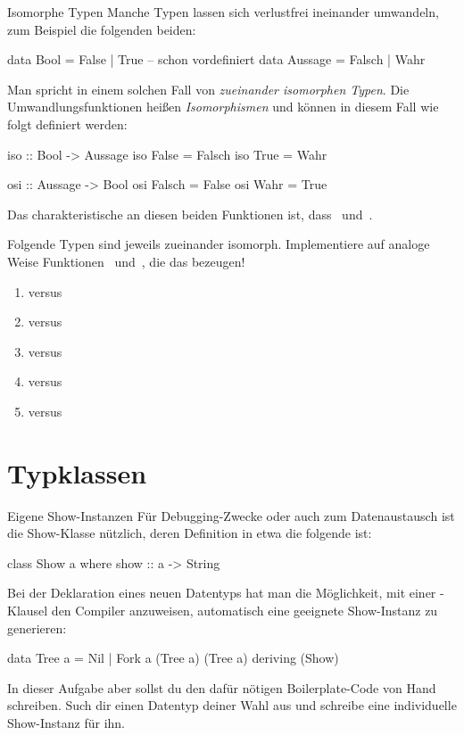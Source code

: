\documentclass{uebblatt}
\begin{document}
\begin{aufgabe}{Isomorphe Typen}
Manche Typen lassen sich verlustfrei ineinander umwandeln, zum Beispiel die
folgenden beiden:
\begin{haskellcode}
data Bool    = False  | True  -- schon vordefiniert
data Aussage = Falsch | Wahr
\end{haskellcode}
Man spricht in einem solchen Fall von \emph{zueinander isomorphen Typen}. Die
Umwandlungsfunktionen heißen \emph{Isomorphismen} und können in diesem Fall wie
folgt definiert werden:
\begin{haskellcode}
iso :: Bool -> Aussage
iso False = Falsch
iso True  = Wahr

osi :: Aussage -> Bool
osi Falsch = False
osi Wahr   = True
\end{haskellcode}
Das charakteristische an diesen beiden Funktionen ist, dass~ und~.

Folgende Typen sind jeweils zueinander isomorph. Implementiere
auf analoge Weise Funktionen~ und~, die
das bezeugen!
\begin{enumerate}
\item {}          versus 
\item {}     versus 
\item {} versus 
\item {}     versus 
\item {}     versus 
\end{enumerate}
\end{aufgabe}


\section{Typklassen}

\begin{aufgabe}{Eigene Show-Instanzen}
Für Debugging-Zwecke oder auch zum Datenaustausch ist die Show-Klasse nützlich,
deren Definition in etwa die folgende ist:
\begin{haskellcode}
class Show a where
    show :: a -> String
\end{haskellcode}
Bei der Deklaration eines neuen Datentyps hat man die Möglichkeit, mit einer
-Klausel den Compiler anzuweisen, automatisch eine
geeignete Show-Instanz zu generieren:
\begin{haskellcode}
data Tree a = Nil | Fork a (Tree a) (Tree a)
    deriving (Show)
\end{haskellcode}
In dieser Aufgabe aber sollst du den dafür nötigen Boilerplate-Code von Hand
schreiben. Such dir einen Datentyp deiner Wahl aus und schreibe eine
individuelle Show-Instanz für ihn.
\end{aufgabe}
\end{document}
